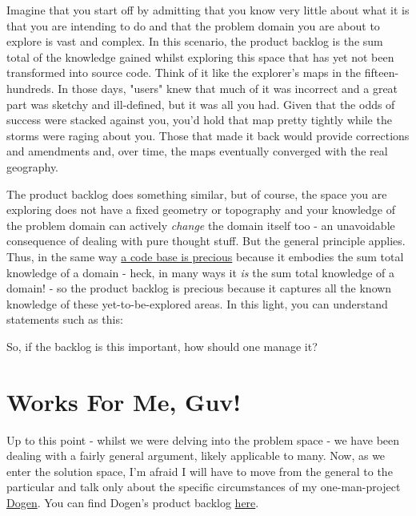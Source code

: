 \documentclass{book}
\begin{document}
Imagine that you start off by admitting that you know very little
about what it is that you are intending to do and that the problem
domain you are about to explore is vast and complex. In this scenario,
the product backlog is the sum total of the knowledge gained whilst
exploring this space that has yet not been transformed into source
code. Think of it like the explorer's maps in the fifteen-hundreds. In
those days, "users" knew that much of it was incorrect and a great
part was sketchy and ill-defined, but it was all you had. Given that
the odds of success were stacked against you, you'd hold that map
pretty tightly while the storms were raging about you. Those that made
it back would provide corrections and amendments and, over time, the
maps eventually converged with the real geography.

The product backlog does something similar, but of course, the space
you are exploring does not have a fixed geometry or topography and
your knowledge of the problem domain can actively \emph{change} the domain
itself too - an unavoidable consequence of dealing with pure thought
stuff. But the general principle applies. Thus, in the same way \href{http://www.joelonsoftware.com/articles/fog0000000069.html}{a code
base is precious} because it embodies the sum total knowledge of a
domain - heck, in many ways it \emph{is} the sum total knowledge of a
domain! - so the product backlog is precious because it captures all
the known knowledge of these yet-to-be-explored areas. In this light,
you can understand statements such as this:

So, if the backlog is this important, how should one manage it?

\section*{Works For Me, Guv!}
\label{sec-5}

Up to this point - whilst we were delving into the problem space - we
have been dealing with a fairly general argument, likely applicable to
many. Now, as we enter the solution space, I'm afraid I will have to
move from the general to the particular and talk only about the
specific circumstances of my one-man-project \href{https://github.com/DomainDrivenConsulting/dogen}{Dogen}. You can find
Dogen's product backlog \href{https://github.com/DomainDrivenConsulting/dogen/blob/master/doc/agile/product_backlog.org}{here}.
\end{document}
